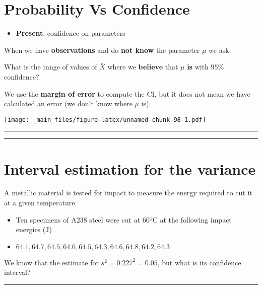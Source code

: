 \documentclass[
]{book}
\providecommand{\tightlist}{%
  \setlength{\itemsep}{0pt}\setlength{\parskip}{0pt}}
\begin{document}
\hypertarget{probability-vs-confidence-1}{%
\section{Probability Vs Confidence}\label{probability-vs-confidence-1}}

\begin{itemize}
\tightlist
\item
  \textbf{Present}: confidence on parameters
\end{itemize}

When we have \textbf{observations} and do \textbf{not know} the parameter \(\mu\) we ask:

What is the range of values of \(\bar{X}\) where we \textbf{believe} that \(\mu\) \textbf{is} with \(95\%\) confidence?

We use the \textbf{margin of error} to compute the CI, but it does not mean we have calculated an error (we don't know where \(\mu\) is).

\texttt{[image: \_main\_files/figure-latex/unnamed-chunk-98-1.pdf]}

\begin{center}\rule{0.5\linewidth}{0.5pt}\end{center}

\begin{center}\rule{0.5\linewidth}{0.5pt}\end{center}

\hypertarget{interval-estimation-for-the-variance}{%
\section{Interval estimation for the variance}\label{interval-estimation-for-the-variance}}

A metallic material is tested for impact to measure the energy required to cut it at a given temperature.

\begin{itemize}
\item
  Ten specimens of A238 steel were cut at 60ºC at the following impact energies (J)
\item
  \(64.1, 64.7, 64.5, 64.6, 64.5, 64.3, 64.6, 64.8, 64.2, 64.3\)
\end{itemize}

We know that the estimate for \(s^2=0.227^2=0.05\), but what is its confidence interval?

\begin{center}\rule{0.5\linewidth}{0.5pt}\end{center}
\end{document}
